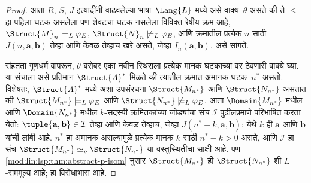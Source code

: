 \begin{proof}
आता $R$, $S$, $J$ इत्यादींनी वाढवलेल्या भाषा~$\Lang{L}$ मध्ये
असे वाक्य~$\theta$ असते की ते $\le$ हा पहिला घटक असलेला पण शेवटचा
घटक नसलेला विविक्त रेषीय क्रम आहे, $\Struct{M}_n \models_L \varphi_{E}$,
$\Struct{N}_n \not\models_L \varphi_{E}$, आणि क्रमातील प्रत्येक $n$ साठी
$J(n, \mathbf{a}, \mathbf{b})$ तेव्हा आणि केवळ तेव्हाच खरे असते,
जेव्हा $I_n(\mathbf{a}, \mathbf{b})$, असे सांगते.


संहतता गुणधर्म वापरून, $\theta$ बरोबर एका नवीन स्थिराला प्रत्येक मानक
घटकाच्या वर ठेवणारी वाक्ये घ्या. या संचाला असे प्रतिमान $\Struct{A}^*$
मिळते की त्यातील क्रमात अमानक घटक~$n^*$ असतो. विशेषतः,
$\Struct{A}^*$ मध्ये अशा उपसंरचना $\Struct{M_{n^*}}$ आणि
$\Struct{N_{n^*}}$ असतात की $\Struct{M_{n^*}} \models_L \varphi_{E}$ आणि
$\Struct{N_{n^*}} \not\models_L \varphi_{E}$. आता $\Domain{M_{n^*}}$ मधील
आणि $\Domain{N_{n^*}}$ मधील $k$-सदस्यी क्रमितकांच्या जोड्यांचा संच
$\mathcal{I}$ पुढीलप्रमाणे परिभाषित करता येतो: $\tuple{\mathbf{a},
\mathbf{b}} \in \mathcal{I}$ तेव्हा आणि केवळ तेव्हाच, जेव्हा
$J(n^*-k, \mathbf{a}, \mathbf{b})$; येथे $k$ ही $\mathbf{a}$ आणि
$\mathbf{b}$ यांची लांबी आहे. $n^*$ हा अमानक असल्यामुळे प्रत्येक मानक
$k$ साठी $n^* - k >0$ असते, आणि $\mathcal{I}$ हा संच
$\Struct{M_{n^*}} \simeq_p \Struct{N_{n^*}}$ या वस्तुस्थितीचा साक्षी
आहे. पण \ref{mod:lin:lsp:thm:abstract-p-isom} नुसार $\Struct{M_{n^*}}$ ही
$\Struct{N_{n^*}}$ शी $L$-सममूल्य आहे; हा विरोधाभास आहे.


\end{proof}



